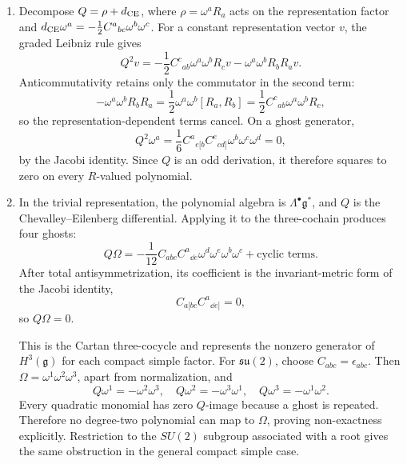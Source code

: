 \begin{enumerate}
  \begin{enumerate}
    \item[(a)]
    Decompose \(Q=\rho+d_{\rm CE}\), where
    \(\rho=\omega^aR_a\) acts on the representation factor and
    \(d_{\rm CE}\omega^a=-\tfrac12C^a{}_{bc}\omega^b\omega^c\).
    For a constant representation vector \(v\), the graded Leibniz rule
    gives
    \[
      Q^2v
       =-\frac12C^c{}_{ab}\omega^a\omega^bR_cv
        -\omega^a\omega^bR_bR_av.
    \]
    Anticommutativity retains only the commutator in the second term:
    \[
      -\omega^a\omega^bR_bR_a
        =\frac12\omega^a\omega^b[R_a,R_b]
        =\frac12C^c{}_{ab}\omega^a\omega^bR_c,
    \]
    so the representation-dependent terms cancel.  On a ghost generator,
    \[
      Q^2\omega^a
        =\frac16C^a{}_{e[b}C^e{}_{cd]}
          \omega^b\omega^c\omega^d=0,
    \]
    by the Jacobi identity.  Since \(Q\) is an odd derivation, it therefore
    squares to zero on every \(R\)-valued polynomial.
    \item[(b)]
    In the trivial representation, the polynomial algebra is
    \(\Lambda^\bullet\mathfrak g^*\), and \(Q\) is the
    Chevalley--Eilenberg differential.  Applying it to the three-cochain
    produces four ghosts:
    \[
      Q\Omega
        =-\frac1{12}C_{abc}C^a{}_{\dd e}
          \omega^d\omega^e\omega^b\omega^c+\text{cyclic terms}.
    \]
    After total antisymmetrization, its coefficient is the invariant-metric
    form of the Jacobi identity,
    \[
      C_{a[bc}C^a{}_{\dd e]}=0,
    \]
    so \(Q\Omega=0\).

    This is the Cartan three-cocycle and represents the nonzero generator of
    \(H^3(\mathfrak g)\) for each compact simple factor.  For
    \(\mathfrak{su}(2)\), choose \(C_{abc}=\epsilon_{abc}\).  Then
    \(\Omega=\omega^1\omega^2\omega^3\), apart from normalization, and
    \[
      Q\omega^1=-\omega^2\omega^3,\quad
      Q\omega^2=-\omega^3\omega^1,\quad
      Q\omega^3=-\omega^1\omega^2.
    \]
    Every quadratic monomial has zero \(Q\)-image because a ghost is repeated.
    Therefore no degree-two polynomial can map to \(\Omega\), proving
    non-exactness explicitly.  Restriction to the \(SU(2)\) subgroup
    associated with a root gives the same obstruction in the general compact
    simple case.
  \end{enumerate}


\end{enumerate}
